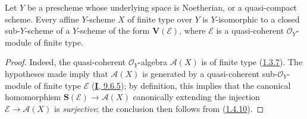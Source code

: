 \begin{proposition}[1.7.15]
\label{II.1.7.15}
Let $Y$ be a prescheme whose underlying space is Noetherian, or a
quasi-compact scheme. Every affine $Y$-scheme $X$ of finite type over $Y$ is
$Y$-isomorphic to a closed sub-$Y$-scheme of a $Y$-scheme of the form
$\mathbf{V}(\mathcal{E})$, where $\mathcal{E}$ is a quasi-coherent
$\mathcal{O}_Y$-module of finite type.
\end{proposition}

\begin{proof}
Indeed, the quasi-coherent $\mathcal{O}_Y$-algebra $\mathcal{A}(X)$ is of
finite type (\hyperref[II.1.3.7]{1.3.7}). The hypotheses made imply
that $\mathcal{A}(X)$ is generated by a quasi-coherent
sub-$\mathcal{O}_Y$-module of finite type $\mathcal{E}$
(\hyperref[I.9.6.5]{\textbf{I}, 9.6.5}); by definition, this implies that
the canonical homomorphism
$\mathbf{S}(\mathcal{E})\to\mathcal{A}(X)$ canonically extending
the injection $\mathcal{E}\to\mathcal{A}(X)$ is \emph{surjective}; the
conclusion then follows from (\hyperref[II.1.4.10]{1.4.10}).
\end{proof}

